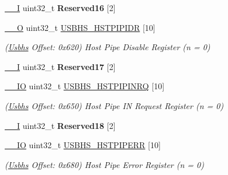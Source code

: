 \begin{DoxyCompactItemize}
\mbox{\label{structUsbhs_a0654a542ce6917e191404e585b80bbac}} 
\mbox{\hyperlink{core__cm7_8h_af63697ed9952cc71e1225efe205f6cd3}{\+\_\+\+\_\+I}} uint32\+\_\+t {\bfseries Reserved16} \mbox{[}2\mbox{]}
\item 
\mbox{\label{structUsbhs_a1bcd3f674d42836da6e192130d1e83e5}} 
\mbox{\hyperlink{core__cm7_8h_a7e25d9380f9ef903923964322e71f2f6}{\+\_\+\+\_\+O}} uint32\+\_\+t \mbox{\hyperlink{structUsbhs_a1bcd3f674d42836da6e192130d1e83e5}{U\+S\+B\+H\+S\+\_\+\+H\+S\+T\+P\+I\+P\+I\+DR}} \mbox{[}10\mbox{]}
\begin{DoxyCompactList}\small\item\em (\mbox{\hyperlink{structUsbhs}{Usbhs}} Offset\+: 0x620) Host Pipe Disable Register (n = 0) \end{DoxyCompactList}\item 
\mbox{\label{structUsbhs_acbdea0dfbadc8577035d942f6240b702}} 
\mbox{\hyperlink{core__cm7_8h_af63697ed9952cc71e1225efe205f6cd3}{\+\_\+\+\_\+I}} uint32\+\_\+t {\bfseries Reserved17} \mbox{[}2\mbox{]}
\item 
\mbox{\label{structUsbhs_a53166973d074ba5109b3f28653fd7bcb}} 
\mbox{\hyperlink{core__cm7_8h_aec43007d9998a0a0e01faede4133d6be}{\+\_\+\+\_\+\+IO}} uint32\+\_\+t \mbox{\hyperlink{structUsbhs_a53166973d074ba5109b3f28653fd7bcb}{U\+S\+B\+H\+S\+\_\+\+H\+S\+T\+P\+I\+P\+I\+N\+RQ}} \mbox{[}10\mbox{]}
\begin{DoxyCompactList}\small\item\em (\mbox{\hyperlink{structUsbhs}{Usbhs}} Offset\+: 0x650) Host Pipe IN Request Register (n = 0) \end{DoxyCompactList}\item 
\mbox{\label{structUsbhs_a19298b4369c14940fe83bf3b88084b6f}} 
\mbox{\hyperlink{core__cm7_8h_af63697ed9952cc71e1225efe205f6cd3}{\+\_\+\+\_\+I}} uint32\+\_\+t {\bfseries Reserved18} \mbox{[}2\mbox{]}
\item 
\mbox{\label{structUsbhs_aafc9951fb9706cd251888be280db015e}} 
\mbox{\hyperlink{core__cm7_8h_aec43007d9998a0a0e01faede4133d6be}{\+\_\+\+\_\+\+IO}} uint32\+\_\+t \mbox{\hyperlink{structUsbhs_aafc9951fb9706cd251888be280db015e}{U\+S\+B\+H\+S\+\_\+\+H\+S\+T\+P\+I\+P\+E\+RR}} \mbox{[}10\mbox{]}
\begin{DoxyCompactList}\small\item\em (\mbox{\hyperlink{structUsbhs}{Usbhs}} Offset\+: 0x680) Host Pipe Error Register (n = 0) \end{DoxyCompactList}\item 

\end{DoxyCompactItemize}
